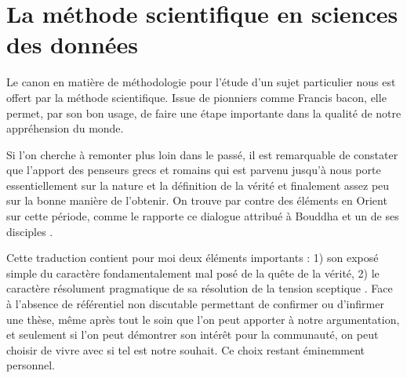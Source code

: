 \chapter{ \nmu La méthode scientifique en sciences des données} \label{chap:methode}


Le canon en matière de méthodologie pour l'étude d'un sujet particulier nous est offert par la méthode scientifique. Issue de pionniers comme Francis bacon\cite{bacon1878novum}, elle permet, par son bon usage, de faire une étape importante dans la qualité de notre appréhension du monde.

Si l'on cherche à remonter plus loin dans le passé, il est remarquable de constater que l'apport des penseurs grecs et romains qui est parvenu jusqu'à nous porte essentiellement sur la nature et la définition de la vérité et finalement assez peu sur la bonne manière de l’obtenir. On trouve par contre des éléments en Orient sur cette période, comme le rapporte ce dialogue attribué à Bouddha et un de ses disciples .

Cette traduction contient pour moi deux éléments importants : 1) son exposé simple du caractère fondamentalement mal posé de la quête de la vérité, 2) le caractère résolument pragmatique de sa résolution de la \og tension sceptique \fg. Face à l'absence de référentiel non discutable permettant de confirmer ou d'infirmer une thèse, même après tout le soin que l'on peut apporter à notre argumentation, et seulement si l'on peut démontrer son intérêt pour la communauté, on peut choisir de vivre avec si tel est notre souhait. Ce choix restant éminemment personnel.

